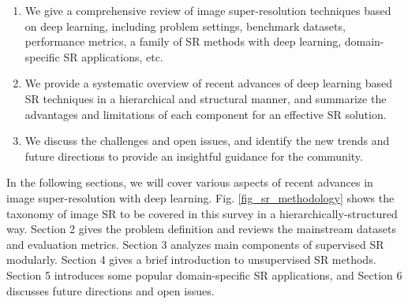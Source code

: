 \begin{enumerate}
    \item We give a comprehensive review of image super-resolution techniques based on deep learning, including problem settings, benchmark datasets, performance metrics, a family of SR methods with deep learning, domain-specific SR applications, etc.
    \item We provide a systematic overview of recent advances of deep learning based SR techniques in a hierarchical and structural manner, and summarize the advantages and limitations of each component for an effective SR solution.
    \item We discuss the challenges and open issues, and identify the new trends and future directions to provide an insightful guidance for the community.
\end{enumerate}
In the following sections, we will cover various aspects of recent advances in image super-resolution with deep learning.
Fig. \ref{fig_sr_methodology} shows the taxonomy of image SR to be covered in this survey in a hierarchically-structured way.
Section 2 gives the problem definition and reviews the mainstream datasets and evaluation metrics.
Section 3 analyzes main components of supervised SR modularly.
Section 4 gives a brief introduction to unsupervised SR methods.
Section 5 introduces some popular domain-specific SR applications, and Section 6 discusses future directions and open issues.

\label{sec_problem_setting}

